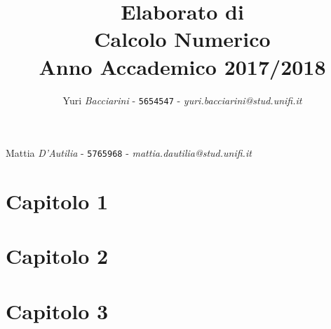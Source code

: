 \documentclass[a4paper]{article}
\date{}
\begin{document}
\title{\vspace{2cm}Elaborato di\\ \textbf{Calcolo Numerico}\\ Anno Accademico 2017/2018\vspace{3cm}}

\author
{Yuri \emph{Bacciarini} - \texttt{5654547} - {\textit{yuri.bacciarini@stud.unifi.it}}}
{Mattia \emph{D'Autilia} - \texttt{5765968} - {\textit{mattia.dautilia@stud.unifi.it}}}

\maketitle
\newpage
\tableofcontents


\newpage
\section{\textbf{Capitolo 1}}


\newpage
\section{\textbf{Capitolo 2}}


\newpage
\section{\textbf{Capitolo 3}}


\end{document}
